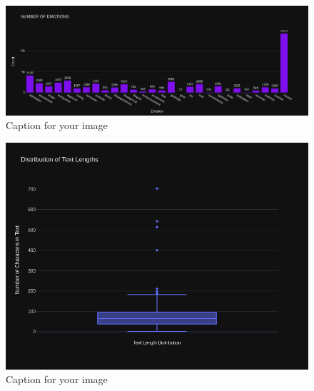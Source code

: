 \documentclass{article}
\begin{document}
\begin{figure}[h!]
  \centering
  \includegraphics[width=1\textwidth]{goemo2.png} 
  \caption{Caption for your image}
  \label{fig:your-label}
\end{figure}
\begin{figure}[h!]
  \centering
  \includegraphics[width=1\textwidth]{goemo3.png} 
  \caption{Caption for your image}
  \label{fig:your-label}
\end{figure}
\FloatBarrier
\end{document}
